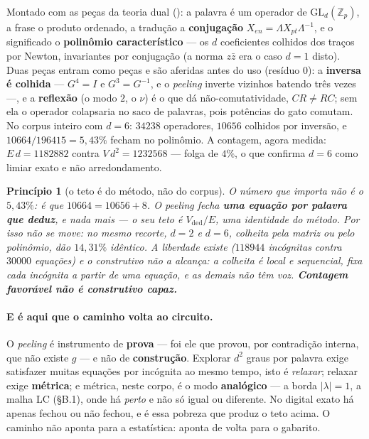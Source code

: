 \documentclass[11pt,a4paper]{article}
\newcommand{\Z}{\mathbb Z}
\newcommand{\code}[1]{\ifmmode\text{\ttfamily\small #1}\else{\ttfamily\small #1}\fi}
\newtheorem{principio}{Princípio}
\theoremstyle{remark}
\begin{document}
Montado com as peças da teoria dual (\code{tatoeba/operador.c}): a palavra é um operador de
$\mathrm{GL}_d(\Z_p)$, a frase o produto ordenado, a tradução a \textbf{conjugação}
$X_{en}=\Lambda X_{pt}\Lambda^{-1}$, e o significado o \textbf{polinômio característico} --- os $d$
coeficientes colhidos dos traços por Newton, invariantes por conjugação (a norma $z\bar z$ era o caso
$d=1$ disto). Duas peças entram como peças e são aferidas antes do uso (resíduo $0$): a \textbf{inversa
é colhida} --- $G^4=I$ e $G^3=G^{-1}$, e o \emph{peeling} inverte vizinhos batendo três vezes ---, e a
\textbf{reflexão} (o modo $2$, o $\nu$) é o que dá não-comutatividade, $CR\neq RC$; sem ela o operador
colapsaria no saco de palavras, pois potências do gato comutam. No corpus inteiro com $d=6$: $34238$
operadores, $10656$ colhidos por inversão, e $10664/196415=5{,}43\%$ fecham no polinômio. A contagem,
agora medida: $E\,d=1182882$ contra $V\,d^2=1232568$ --- folga de $4\%$, o que confirma $d=6$ como
limiar exato e não arredondamento.

\begin{principio}[o teto é do método, não do corpus]
O número que importa não é o $5{,}43\%$: é que $10664=10656+8$. O \emph{peeling} fecha \textbf{uma
equação por palavra que deduz}, e nada mais --- o seu teto é $V_{\text{ded}}/E$, uma identidade do
método. Por isso não se move: no mesmo recorte, $d=2$ e $d=6$, colheita pela matriz ou pelo polinômio,
dão $14{,}31\%$ \emph{idêntico}. A liberdade existe ($118944$ incógnitas contra $30000$ equações) e o
construtivo não a alcança: a colheita é local e sequencial, fixa cada incógnita a partir de \emph{uma}
equação, e as demais não têm voz. \textbf{Contagem favorável não é construtivo capaz.}
\end{principio}

\paragraph{E é aqui que o caminho volta ao circuito.} O \emph{peeling} é instrumento de \textbf{prova}
--- foi ele que provou, por contradição interna, que não existe $g$ --- e não de \textbf{construção}.
Explorar $d^2$ graus por palavra exige satisfazer muitas equações por incógnita ao mesmo tempo, isto é
\emph{relaxar}; relaxar exige \textbf{métrica}; e métrica, neste corpo, é o modo \textbf{analógico} ---
a borda $|\lambda|=1$, a malha LC (§B.1), onde há \emph{perto} e não só igual ou diferente. No digital
exato há apenas fechou ou não fechou, e é essa pobreza que produz o teto acima. O caminho não aponta
para a estatística: aponta de volta para o gabarito.
\end{document}
